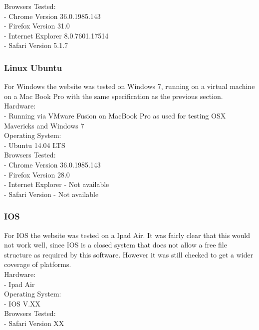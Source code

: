 \documentclass[a4paper,11pt,titlepage]{article}
\begin{document}
\noindent Browsers Tested:\\
- Chrome Version 36.0.1985.143\\
- Firefox Version 31.0\\
- Internet Explorer 8.0.7601.17514\\
- Safari Version 5.1.7\\


\subsubsection*{Linux Ubuntu}

For Windows the website was tested on Windows 7, running on a virtual machine on a Mac Book Pro with the same specification as the previous section.\\

\noindent Hardware:\\
- Running via VMware Fusion on MacBook Pro as used for testing OSX Mavericks and Windows 7\\

\noindent Operating System:\\
- Ubuntu 14.04 LTS\\

\noindent Browsers Tested:\\
- Chrome Version 36.0.1985.143\\
- Firefox Version 28.0\\
- Internet Explorer - Not available\\
- Safari Version - Not available


\subsubsection*{IOS}

For IOS the website was tested on a Ipad Air. It was fairly clear that this would not work well, since IOS is a closed system that does not allow a free file structure as required by this software. However it was still checked to get a wider coverage of platforms.\\

\noindent Hardware:\\
- Ipad Air\\

\noindent Operating System:\\
- IOS V.XX\\

\noindent Browsers Tested:\\
- Safari Version XX
\end{document}
